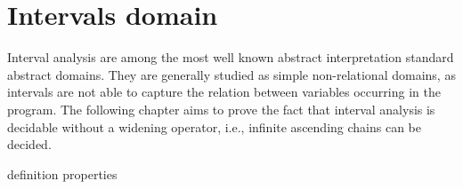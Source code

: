 \section{Intervals domain}
\label{sec:intervals}

Interval analysis are among the most well known abstract
interpretation standard abstract domains. They are generally studied
as simple non-relational domains, as intervals are not able to capture
the relation between variables occurring in the program.  The
following chapter aims to prove the fact that interval analysis is
decidable without a widening operator, i.e., infinite ascending chains
can be decided.

{definition}
{properties}
